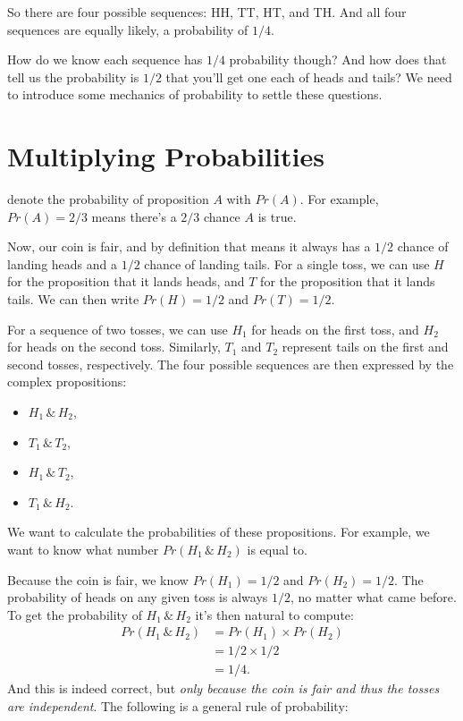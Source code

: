 \documentclass[justified]{tufte-book}
\providecommand{\tightlist}{%
  \setlength{\itemsep}{0pt}\setlength{\parskip}{0pt}}
\theoremstyle{definition}
\theoremstyle{definition}
\theoremstyle{definition}
\theoremstyle{remark}
\begin{document}
So there are four possible sequences: HH, TT, HT, and TH. And all four
sequences are equally likely, a probability of \(1/4\).

How do we know each sequence has \(1/4\) probability though? And how
does that tell us the probability is \(1/2\) that you'll get one each of
heads and tails? We need to introduce some mechanics of probability to
settle these questions.

\hypertarget{multiplying-probabilities}{%
\section{Multiplying Probabilities}\label{multiplying-probabilities}}

 denote the probability of proposition \(A\) with
\(Pr(A)\). For example, \(Pr(A)=2/3\) means there's a \(2/3\) chance
\(A\) is true.

Now, our coin is fair, and by definition that means it always has a
\(1/2\) chance of landing heads and a \(1/2\) chance of landing tails.
For a single toss, we can use \(H\) for the proposition that it lands
heads, and \(T\) for the proposition that it lands tails. We can then
write \(Pr(H) = 1/2\) and \(Pr(T) = 1/2\).

For a sequence of two tosses, we can use \(H_1\) for heads on the first
toss, and \(H_2\) for heads on the second toss. Similarly, \(T_1\) and
\(T_2\) represent tails on the first and second tosses, respectively.
The four possible sequences are then expressed by the complex
propositions:

\begin{itemize}
\tightlist
\item
  \(H_1 \,\&\, H_2\),
\item
  \(T_1 \,\&\, T_2\),
\item
  \(H_1 \,\&\, T_2\),
\item
  \(T_1 \,\&\, H_2\).
\end{itemize}

We want to calculate the probabilities of these propositions. For
example, we want to know what number \(Pr(H_1 \,\&\, H_2)\) is equal to.

Because the coin is fair, we know \(Pr(H_1) = 1/2\) and
\(Pr(H_2) = 1/2\). The probability of heads on any given toss is always
\(1/2\), no matter what came before. To get the probability of
\(H_1 \,\&\, H_2\) it's then natural to compute: \[
  \begin{aligned}
    Pr(H_1 \,\&\, H_2) &= Pr(H_1) \times Pr(H_2)\\
                       &= 1/2 \times 1/2\\
                       &= 1/4.
  \end{aligned}
\] And this is indeed correct, but \emph{only because the coin is fair
and thus the tosses are independent}. The following is a general rule of
probability:
\end{document}
